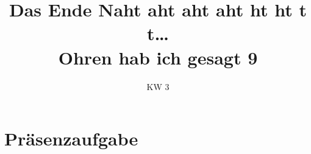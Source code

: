 \relax\relax

\iffull
\def\smlll{\texorpdfstring{\def\RSsmallest{2pt}\smaller[2]}{}}
\title[Neuntes Tutorium -- Übungsblatt 9]{Das Ende Naht {\smlll aht \smlll aht \smlll aht \smlll ht \smlll ht \smlll t \smlll t\ldots}\\\small Ohren hab ich gesagt 9}
\date{\sffamily KW 3}

\usepackage[glows]{tikzpingus}
\usetikzlibrary{decorations.text,matrix}
\hypersetup{colorlinks=false}


\fi

\newsavebox\sadGrapplePingu \savebox{}
\section{Präsenzaufgabe}
